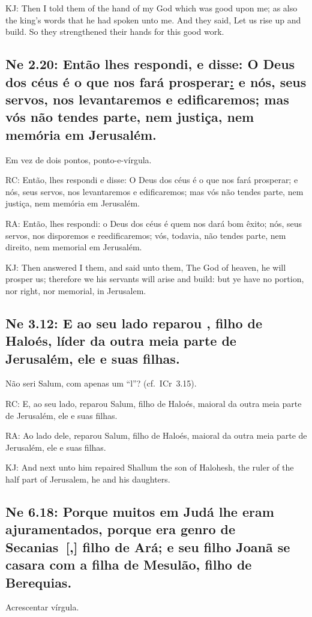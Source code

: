 KJ: Then I told them of the hand of my God which was good upon me; as also the king's words that he had spoken unto me. And they said, Let us rise up and build. So they strengthened their hands for this good work.

\subsection{Ne 2.20: Então lhes respondi, e disse: O Deus dos céus é o que nos fará prosperar\uline{:} e nós, seus servos, nos levantaremos e edificaremos; mas vós não tendes parte, nem justiça, nem memória em Jerusalém.}
Em vez de dois pontos, ponto-e-vírgula.

RC: Então, lhes respondi e disse: O Deus dos céus é o que nos fará prosperar; e nós, seus servos, nos levantaremos e edificaremos; mas vós não tendes parte, nem justiça, nem memória em Jerusalém.

RA: Então, lhes respondi: o Deus dos céus é quem nos dará bom êxito; nós, seus servos, nos disporemos e reedificaremos; vós, todavia, não tendes parte, nem direito, nem memorial em Jerusalém.

KJ: Then answered I them, and said unto them, The God of heaven, he will prosper us; therefore we his servants will arise and build: but ye have no portion, nor right, nor memorial, in Jerusalem.

\subsection{Ne 3.12: E ao seu lado reparou , filho de Haloés, líder da outra meia parte de Jerusalém, ele e suas filhas.}
Não seri Salum, com apenas um ``l''? (cf.~ICr~3.15).

RC: E, ao seu lado, reparou Salum, filho de Haloés, maioral da outra meia parte de Jerusalém, ele e suas filhas.

RA: Ao lado dele, reparou Salum, filho de Haloés, maioral da outra meia parte de Jerusalém, ele e suas filhas.

KJ: And next unto him repaired Shallum the son of Halohesh, the ruler of the half part of Jerusalem, he and his daughters.

\subsection{Ne 6.18: Porque muitos em Judá lhe eram ajuramentados, porque era genro de Secanias~[,] filho de Ará; e seu filho Joanã se casara com a filha de Mesulão, filho de Berequias.}
Acrescentar vírgula.

